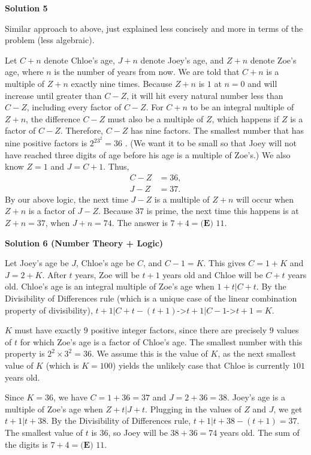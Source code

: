\begin{enumerate}
 



\textbf{Solution 5}

Similar approach to above, just explained less concisely and more in terms of the problem (less algebraic).

 Let $C+n$ denote Chloe's age, $J+n$ denote Joey's age, and $Z+n$ denote Zoe's age, where $n$ is the number of years from now. We are told that $C+n$ is a multiple of $Z+n$ exactly nine times. Because $Z+n$ is $1$ at $n=0$ and will increase until greater than $C-Z$, it will hit every natural number less than $C-Z$, including every factor of $C-Z$. For $C+n$ to be an integral multiple of $Z+n$, the difference $C-Z$ must also be a multiple of $Z$, which happens if $Z$ is a factor of $C-Z$. Therefore, $C-Z$ has nine factors. The smallest number that has nine positive factors is $2^23^2=36$ . (We want it to be small so that Joey will not have reached three digits of age before his age is a multiple of Zoe's.) We also know $Z=1$ and $J=C+1$. Thus,
 \begin{align*} C-Z&=36, \\ J-Z&=37. \end{align*}
By our above logic, the next time $J-Z$ is a multiple of $Z+n$ will occur when $Z+n$ is a factor of $J-Z$. Because $37$ is prime, the next time this happens is at $Z+n=37$, when $J+n=74$. The answer is $7+4=\boxed{\textbf{(E) }11}$.

 



\textbf{Solution 6 (Number Theory + Logic)}

Let Joey's age be $J$, Chloe's age be $C$, and $C-1=K$. This gives $C=1+K$ and $J=2+K$. After $t$ years, Zoe will be $t+1$ years old and Chloe will be $C+t$ years old. Chloe's age is an integral multiple of Zoe's age when $1+t|C+t$. By the Divisibility of Differences rule (which is a unique case of the linear combination property of divisibility), $t+1|C+t-(t+1)$->$t+1|C-1$->$t+1=K$.

 $K$ must have exactly $9$ positive integer factors, since there are precisely $9$ values of $t$ for which Zoe's age is a factor of Chloe's age. The smallest number with this property is $2^2 \times 3^2=36$. We assume this is the value of $K$, as the next smallest value of $K$ (which is $K=100$) yields the unlikely case that Chloe is currently $101$ years old. 

 Since $K=36$, we have $C=1+36=37$ and $J=2+36=38$. Joey's age is a multiple of Zoe's age when $Z+t|J+t$. Plugging in the values of $Z$ and $J$, we get $t+1|t+38$. By the Divisibility of Differences rule, $t+1|t+38-(t+1)=37$. The smallest value of $t$ is $36$, so Joey will be $38+36=74$ years old. The sum of the digits is $7+4=\boxed{\textbf{(E) } 11}$.


\end{enumerate}
